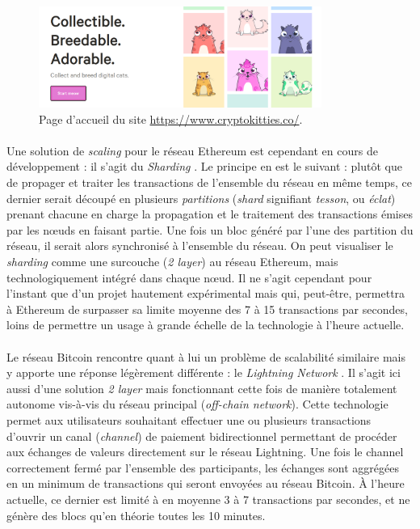 \begin{figure}[ht]
    \centering
    \includegraphics[width=350px]{chapters/02/images/cryptokitties.png}
    \caption{\label{cryptokitties}Page d'accueil du site \url{https://www.cryptokitties.co/}.}
\end{figure}

\paragraph{} Une solution de \emph{scaling} pour le réseau Ethereum est cependant en cours de développement : il s'agit du 
\emph{Sharding} \cite{Blockchain0}. Le principe en est le suivant : plutôt que de propager et traiter les transactions de
l'ensemble du réseau en même temps, ce dernier serait découpé en plusieurs \emph{partitions} (\emph{shard} signifiant 
\emph{tesson}, ou \emph{éclat}) prenant chacune en charge la propagation et le traitement des transactions émises par les
n\oe{}uds en faisant partie. Une fois un bloc généré par l'une des partition du réseau, il serait alors synchronisé à l'ensemble
du réseau. On peut visualiser le \emph{sharding} comme une surcouche (\emph{2 layer}) au réseau Ethereum, mais technologiquement
intégré dans chaque n\oe{}ud. Il ne s'agit cependant pour l'instant que d'un projet hautement expérimental mais qui, peut-être, 
permettra à Ethereum de surpasser sa limite moyenne des 7 à 15 transactions par secondes, loins de permettre un usage à grande
échelle de la technologie à l'heure actuelle.

\paragraph{} Le réseau Bitcoin rencontre quant à lui un problème de scalabilité similaire mais y apporte une réponse légèrement
différente : le \emph{Lightning Network} \cite{Blockchain2}. Il s'agit ici aussi d'une solution \emph{2 layer} mais
fonctionnant cette fois de manière totalement autonome vis-à-vis du réseau principal (\emph{off-chain network}). Cette 
technologie permet aux utilisateurs souhaitant effectuer une ou plusieurs transactions d'ouvrir un canal (\emph{channel})
de paiement bidirectionnel permettant de procéder aux échanges de valeurs directement sur le réseau Lightning. Une fois
le channel correctement fermé par l'ensemble des participants, les échanges sont aggrégées en un minimum de transactions
qui seront envoyées au réseau Bitcoin. À l'heure actuelle, ce dernier est limité à en moyenne 3 à 7 transactions par secondes,
et ne génère des blocs qu'en théorie toutes les 10 minutes.

